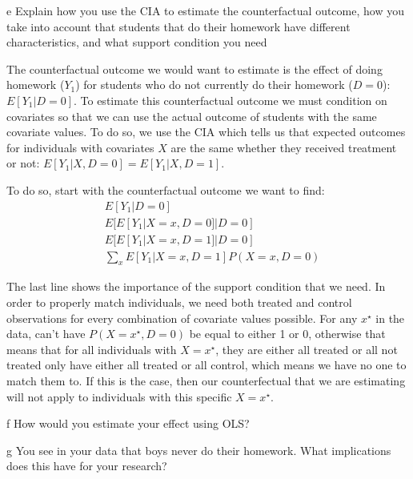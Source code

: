 \documentclass{article}
\begin{document}
\begin{problem}{e}
Explain how you use the CIA to estimate the counterfactual outcome, how you take into account that students that do their homework have different characteristics, and what support condition you need
\end{problem}
\begin{solution}
The counterfactual outcome we would want to estimate is the effect of doing homework ($Y_1$) for students who do not currently do their homework ($D=0$): $E[Y_1|D=0]$. To estimate this counterfactual outcome we must condition on covariates so that we can use the actual outcome of students with the same covariate values. To do so, we use the CIA which tells us that expected outcomes for individuals with covariates $X$ are the same whether they received treatment or not: $E[Y_1|X,D=0]=E[Y_1|X,D=1]$.

To do so, start with the counterfactual outcome we want to find:
\begin{align}
    &E[Y_1|D=0] \tag{Counterfactual outcome} \\
    &E[ E[Y_1| X=x, D=0] | D=0] \tag{Expand inside using LIE} \\
    &E[ E[Y_1| X=x, D=1] | D=0] \tag{Use CIA} \\
    & \sum_{x} E[Y_1 | X=x, D=1] P(X=x,D=0) \tag{Outer E[] as weighted sum}
\end{align}

The last line shows the importance of the support condition that we need. In order to properly match individuals, we need both treated and control observations for every combination of covariate values possible. For any $x^\star$ in the data, can't have $P(X=x^\star,D=0)$ be equal to either 1 or 0, otherwise that means that for all individuals with $X=x^\star$, they are either all treated or all not treated only have either all treated or all control, which means we have no one to match them to. If this is the case, then our counterfectual that we are estimating will not apply to individuals with this specific $X=x^\star$.

\end{solution}

\begin{problem}{f}
How would you estimate your effect using OLS?
\end{problem}
\begin{solution}
\end{solution}


\begin{problem}{g}
You see in your data that boys never do their homework. What implications does this have for your research?
\end{problem}
\begin{solution}
\end{solution}
\end{document}

